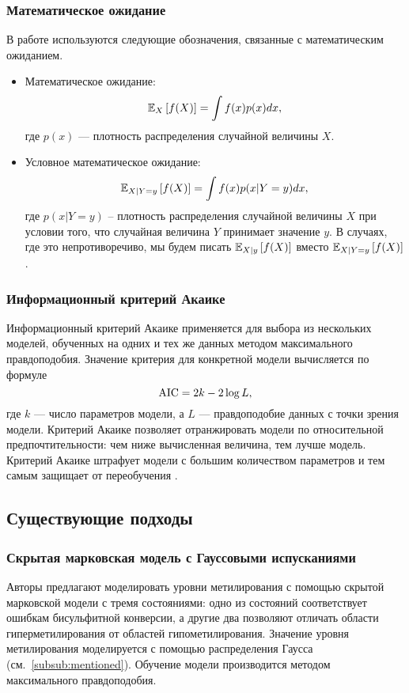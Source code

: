 \subsubsection{Математическое ожидание}

В работе используются следующие обозначения, связанные с математическим ожиданием.

\begin{itemize}
\item Математическое ожидание:
  $$
  \mathbb{E}_{X} \left[ f(X) \right] = \int f(x) p(x) dx,
  $$
  где $p(x)$ --- плотность распределения случайной величины $X$.
\item Условное математическое ожидание:
  $$
  \mathbb{E}_{X|Y = y} \left[ f(X) \right] = \int f(x) p(x|Y = y) dx,
  $$
  где $p(x|Y = y)$ -- плотность распределения случайной величины $X$ при
  условии того, что случайная величина $Y$ принимает значение $y$. В случаях, где это
  непротиворечиво, мы будем писать $\mathbb{E}_{X|y} \left[ f(X) \right]$ вместо $\mathbb{E}_{X|Y = y} \left[ f(X) \right]$.
\end{itemize}

\subsubsection{Информационный критерий Акаике}

Информационный критерий Акаике применяется для выбора из нескольких моделей, обученных на
одних и тех же данных методом максимального правдоподобия. Значение критерия для конкретной
модели вычисляется по формуле
$$
\operatorname{AIC} = 2k - 2 \log L,
$$
где $k$ --- число параметров модели, а $L$ --- правдоподобие данных с точки зрения модели.
Критерий Акаике позволяет отранжировать модели по относительной предпочтительности: чем
ниже вычисленная величина, тем лучше модель. Критерий Акаике штрафует модели с большим
количеством параметров и тем самым защищает от переобучения \cite[С. 163-164]{murphy2012machine}.

\subsection{Существующие подходы}
\label{sub:existing}

\subsubsection{Скрытая марковская модель с Гауссовыми испусканиями}

Авторы \cite{Stadler2011} предлагают моделировать уровни метилирования с помощью скрытой
марковской модели \cite{Rabiner1989} с тремя состояниями: одно из состояний соответствует
ошибкам бисульфитной конверсии, а другие два позволяют отличать области гиперметилирования
от областей гипометилирования. Значение уровня метилирования моделируется с помощью распределения
Гаусса (см.~\ref{subsub:mentioned}). Обучение модели производится методом максимального
правдоподобия.


